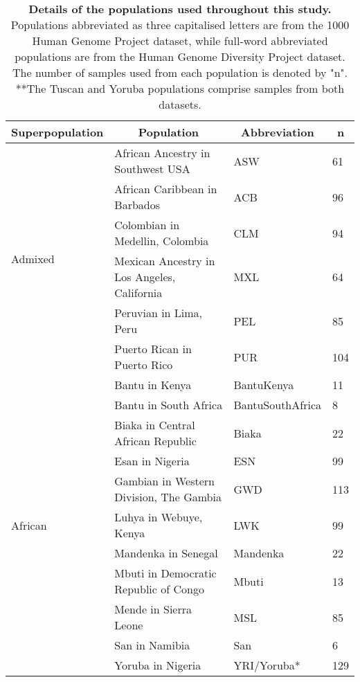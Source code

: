 \documentclass[11pt]{article}
\begin{document}
\begin{table}[htb]
    \centering
    \caption{
        \textbf{Details of the populations used throughout this study.} 
        Populations abbreviated as three capitalised letters are from the 1000 Human Genome Project dataset, while full-word abbreviated populations are from the Human Genome Diversity Project dataset. The number of samples used from each population is denoted by "n". \\
        **The Tuscan and Yoruba populations comprise samples from both datasets.
        }
    \small
    \begin{tabular}{ |p{3cm}||p{8cm}|p{3cm}|p{0.8cm}|  }
    \hline
    \multicolumn{1}{|c||}{\textbf{Superpopulation}} &
    \multicolumn{1}{c|}{\textbf{Population}} & 
    \multicolumn{1}{c|}{\textbf{Abbreviation}} & %
    \multicolumn{1}{c|}{\textbf{n}}\\
    \hline
    \hline
    \multirow{6}{*}{Admixed}  %
        &African Ancestry in Southwest USA & ASW & 61 \\
        &African Caribbean in Barbados & ACB & 96 \\
        &Colombian in Medellin, Colombia & CLM & 94 \\
        &Mexican Ancestry in Los Angeles, California & MXL & 64 \\
        &Peruvian in Lima, Peru & PEL & 85 \\
        &Puerto Rican in Puerto Rico & PUR & 104 \\
        \hline
    \multirow{11}{*}{African}
        &Bantu in Kenya & BantuKenya & 11 \\
        &Bantu in South Africa & BantuSouthAfrica & 8 \\
        &Biaka in Central African Republic & Biaka & 22 \\
        &Esan in Nigeria & ESN & 99 \\
        &Gambian in Western Division, The Gambia & GWD & 113 \\
        &Luhya in Webuye, Kenya & LWK & 99 \\
        &Mandenka in Senegal & Mandenka & 22 \\
        &Mbuti in Democratic Republic of Congo & Mbuti & 13 \\
        &Mende in Sierra Leone & MSL & 85 \\
        &San in Namibia & San & 6 \\
        &Yoruba in Nigeria & YRI/Yoruba* & 129 \\

\end{tabular}
\end{table}
\end{document}
